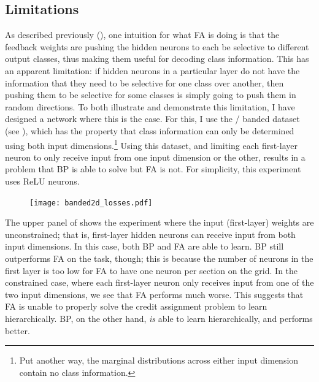 \subsection{Limitations}

As described previously (),
one intuition for what FA is doing
is that the feedback weights are pushing the hidden neurons
to each be selective to different output classes,
thus making them useful for decoding class information.
This has an apparent limitation:
if hidden neurons in a particular layer
do not have the information that they need
to be selective for one class over another,
then pushing them to be selective for some classes
is simply going to push them in random directions.
To both illustrate and demonstrate this limitation,
I have designed a network where this is the case.
For this, I use the \dd/ banded dataset (see ),
which has the property that class information can only be determined
using both input dimensions.\footnote{
  Put another way, the marginal distributions across either input dimension
  contain no class information.}
Using this dataset, and limiting each first-layer neuron to only receive input
from one input dimension or the other,
results in a problem that BP is able to solve but FA is not.
For simplicity, this experiment uses ReLU neurons.

\begin{figure}
  \centering
  \texttt{[image: banded2d\_losses.pdf]}
\end{figure}

The upper panel of 
shows the experiment where the input (first-layer) weights are unconstrained;
that is, first-layer hidden neurons can receive input from both input dimensions.
In this case, both BP and FA are able to learn.
BP still outperforms FA on the task, though;
this is because the number of neurons in the first layer
is too low for FA to have one neuron per section on the grid.
In the constrained case,
where each first-layer neuron only receives input
from one of the two input dimensions,
we see that FA performs much worse.
This suggests that FA is unable to properly solve the credit assignment problem
to learn hierarchically.
BP, on the other hand, \emph{is} able to learn hierarchically,
and performs better.

